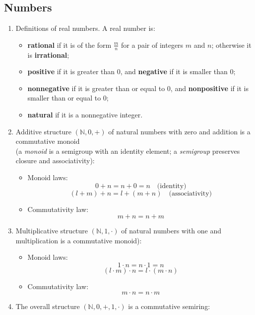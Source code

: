 \documentclass{article}
\begin{document}
\subsection{Numbers}
\begin{enumerate}
    \item Definitions of real numbers. A real number is:
        \begin{itemize}[label={-},topsep=0pt]
            \item \textbf{rational} if it is of the form $\frac{m}{n}$ for a pair of integers $m$ and $n$; otherwise it is \textbf{irrational};
            \item \textbf{positive} if it is greater than 0, and \textbf{negative} if it is smaller than 0;
            \item \textbf{nonnegative} if it is greater than or equal to 0, and \textbf{nonpositive} if it is smaller than or equal to 0;
            \item \textbf{natural} if it is a nonnegative integer.
        \end{itemize}
    \item Additive structure $(\mathbb{N},0,+)$ of natural numbers with zero and addition is a commutative monoid\\(a \textit{monoid} is a semigroup with an identity element; a \textit{semigroup} preserves closure and associativity):
        \begin{itemize}[label={-},topsep=0pt]
            \item Monoid laws:
                $$0+n=n+0=n\quad\text{(identity)}$$
                $$(l+m)+n=l+(m+n)\quad\text{(associativity)}$$
            \item Commutativity law:
                $$m+n=n+m$$
        \end{itemize}
    \item Multiplicative structure $(\mathbb{N},1,\cdot)$ of natural numbers with one and multiplication is a commutative monoid):
        \begin{itemize}[label={-},topsep=0pt]
            \item Monoid laws:
                $$1\cdot n=n\cdot 1=n$$
                $$(l\cdot m)\cdot n=l\cdot(m\cdot n)$$
            \item Commutativity law:
                $$m\cdot n=n\cdot m$$
        \end{itemize}
    \item The overall structure $(\mathbb{N},0,+,1,\cdot)$ is a commutative semiring:
        \begin{itemize}[label={-},topsep=0pt]

\end{itemize}
\end{enumerate}
\end{document}
